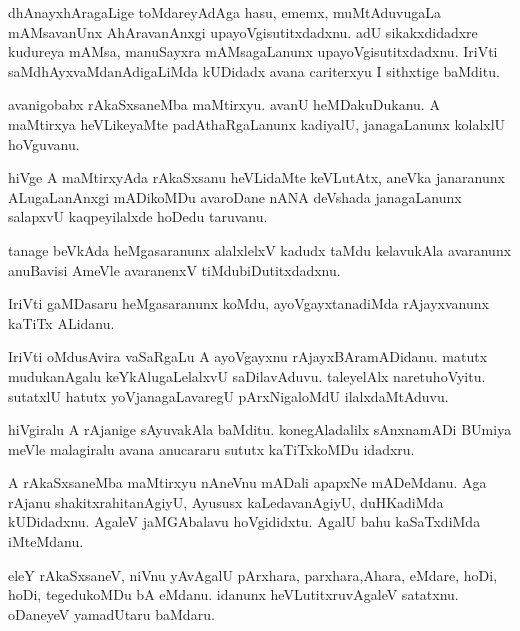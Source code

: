 \documentclass{article}
\begin{document}
\begin{mn}
dhAnayxhAragaLige  toMdareyAdAga  hasu,  ememx,  muMtAduvugaLa  mAMsavanUnx  AhAravanAnxgi  upayoVgisutitxdadxnu.  
adU  sikakxdidadxre  kudureya  mAMsa,  manuSayxra  mAMsagaLanunx  upayoVgisutitxdadxnu.  IriVti  saMdhAyxvaMdanAdigaLiMda  
kUDidadx  avana  cariterxyu  I  sithxtige  baMditu.
\end{mn}

\begin{mn}
avanigobabx  rAkaSxsaneMba  maMtirxyu.  avanU  heMDakuDukanu.  A  maMtirxya  heVLikeyaMte  padAthaRgaLanunx  
kadiyalU,  janagaLanunx  kolalxlU  hoVguvanu.
\end{mn}

\begin{mn}
hiVge  A  maMtirxyAda  rAkaSxsanu  heVLidaMte  keVLutAtx,  aneVka  janaranunx  ALugaLanAnxgi  mADikoMDu  
avaroDane  nANA  deVshada  janagaLanunx  salapxvU  kaqpeyilalxde  hoDedu  taruvanu.
\end{mn}

\begin{mn}
tanage  beVkAda  heMgasaranunx  alalxlelxV  kadudx  taMdu  kelavukAla  avaranunx  anuBavisi  AmeVle  
avaranenxV  tiMdubiDutitxdadxnu.
\end{mn}

\begin{mn}
IriVti  gaMDasaru  heMgasaranunx  koMdu,  ayoVgayxtanadiMda  rAjayxvanunx  kaTiTx  ALidanu.
\end{mn}

\begin{mn}
IriVti  oMdusAvira  vaSaRgaLu  A  ayoVgayxnu  rAjayxBAramADidanu.  matutx  mudukanAgalu  keYkAlugaLelalxvU  
saDilavAduvu.  taleyelAlx  naretuhoVyitu.  sutatxlU  hatutx  yoVjanagaLavaregU  pArxNigaloMdU  ilalxdaMtAduvu.
\end{mn}

\begin{mn}
hiVgiralu  A  rAjanige  sAyuvakAla  baMditu.  konegAladalilx  sAnxnamADi  BUmiya  meVle  malagiralu  avana  
anucararu  sututx kaTiTxkoMDu  idadxru.
\end{mn}

\begin{mn}
A  rAkaSxsaneMba  maMtirxyu  nAneVnu  mADali  apapxNe mADeMdanu.  Aga  rAjanu  shakitxrahitanAgiyU,  Ayususx  
kaLedavanAgiyU,  duHKadiMda  kUDidadxnu.  AgaleV  jaMGAbalavu  hoVgididxtu.  AgalU  bahu  kaSaTxdiMda  iMteMdanu.
\end{mn}

\begin{mn}
eleY  rAkaSxsaneV,  niVnu  yAvAgalU  pArxhara, parxhara,Ahara,  eMdare,  hoDi,  hoDi,  tegedukoMDu  bA  eMdanu.  
idanunx  heVLutitxruvAgaleV  satatxnu.  oDaneyeV  yamadUtaru  baMdaru.
\end{mn}
\end{document}
